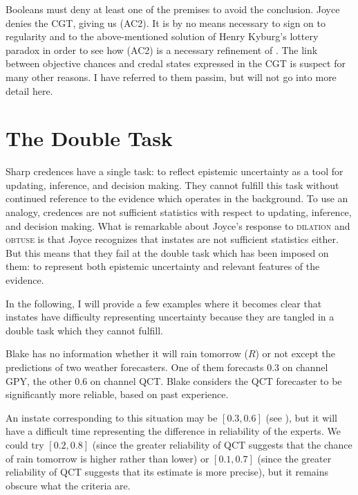 \documentclass[phd,12pt,oneside]{ubcthesis}
\begin{document}
{\noindent}Booleans must deny at least one of the premises to avoid the
conclusion. Joyce denies the CGT, giving us (AC2). It is by no means
necessary to sign on to regularity and to the above-mentioned solution
of Henry Kyburg's lottery paradox in order to see how (AC2) is a
necessary refinement of {\anderson}. The link between objective
chances and credal states expressed in the CGT is suspect for many
other reasons. I have referred to them passim, but will not go into
more detail here.

\section{The Double Task}
\label{sec:ohbooquu}

Sharp credences have a single task: to reflect epistemic uncertainty
as a tool for updating, inference, and decision making. They cannot
fulfill this task without continued reference to the evidence which
operates in the background. To use an analogy, credences are not
sufficient statistics with respect to updating, inference, and
decision making. What is remarkable about Joyce's response to
\textsc{dilation} and \textsc{obtuse} is that Joyce recognizes that
instates are not sufficient statistics either. But this means that
they fail at the double task which has been imposed on them: to
represent both epistemic uncertainty and relevant features of the
evidence.

In the following, I will provide a few examples where it becomes clear
that instates have difficulty representing uncertainty because they
are tangled in a double task which they cannot fulfill.

\begin{quotex}
  \label{ex:aggreg} Blake has no
  information whether it will rain tomorrow ($R$) or not except the
  predictions of two weather forecasters. One of them forecasts 0.3 on
  channel GPY, the other 0.6 on channel QCT. Blake considers the QCT
  forecaster to be significantly more reliable, based on past
  experience.
\end{quotex}

An instate corresponding to this situation may be $[0.3,0.6]$ (see
), but it will have a difficult time
representing the difference in reliability of the experts. We could
try $[0.2,0.8]$ (since the greater reliability of QCT suggests that
the chance of rain tomorrow is higher rather than lower) or
$[0.1,0.7]$ (since the greater reliability of QCT suggests that its
estimate is more precise), but it remains obscure what the criteria
are.
\end{document}
